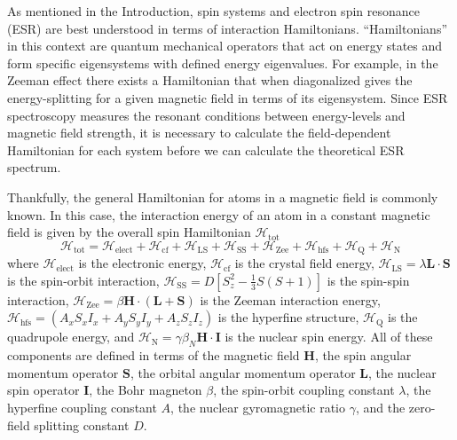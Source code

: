 \documentclass[oneside]{BYUPhys}
\begin{document}
As mentioned in the Introduction, spin systems and electron spin resonance (ESR) are best understood in terms of interaction Hamiltonians. ``Hamiltonians'' in this context are quantum mechanical operators that act on energy states and form specific eigensystems with defined energy eigenvalues. For example, in the Zeeman effect there exists a Hamiltonian that when diagonalized gives the energy-splitting for a given magnetic field in terms of its eigensystem. Since ESR spectroscopy measures the resonant conditions between energy-levels and magnetic field strength, it is necessary to calculate the field-dependent Hamiltonian for each system before we can calculate the theoretical ESR spectrum.

Thankfully, the general Hamiltonian for atoms in a magnetic field is commonly known. In this case, the interaction energy of an atom in a constant magnetic field is given by the overall spin Hamiltonian $\mathcal{H}_{\text{tot}}$ \cite{RefWorks:doc:5ae242e5e4b0cc4b01645923} $$\mathcal{H}_{\text{tot}} = \mathcal{H}_{\text{elect}} + \mathcal{H}_{\text{cf}} + \mathcal{H}_{\text{LS}} + \mathcal{H}_{\text{SS}} + \mathcal{H}_{\text{Zee}} + \mathcal{H}_{\text{hfs}} + \mathcal{H}_{\text{Q}} + \mathcal{H}_{\text{N}}$$ where $\mathcal{H}_{\text{elect}}$ is the electronic energy, $\mathcal{H}_{\text{cf}}$ is the crystal field energy, $\mathcal{H}_{\text{LS}} = \lambda \mathbf{L} \cdot \mathbf{S}$ is the spin-orbit interaction, $\mathcal{H}_{\text{SS}} = D \left[ S_{z}^{2} - \frac{1}{3} S (S+1) \right]$ is the spin-spin interaction, $\mathcal{H}_{\text{Zee}} = \beta \mathbf{H} \cdot (\mathbf{L}+\mathbf{S})$ is the Zeeman interaction energy, $\mathcal{H}_{\text{hfs}} = \left(A_xS_xI_x + A_yS_yI_y + A_zS_zI_z\right)$ is the hyperfine structure, $\mathcal{H}_{\text{Q}}$ is the quadrupole energy, and $\mathcal{H}_{\text{N}} = \gamma \beta_{N} \mathbf{H} \cdot \mathbf{I}$ is the nuclear spin energy. All of these components are defined in terms of the magnetic field $\mathbf{H}$, the spin angular momentum operator $\mathbf{S}$, the orbital angular momentum operator $\mathbf{L}$, the nuclear spin operator $\mathbf{I}$, the Bohr magneton $\beta$, the spin-orbit coupling constant $\lambda$, the hyperfine coupling constant $A$, the nuclear gyromagnetic ratio $\gamma$, and the zero-field splitting constant $D$.
\end{document}
